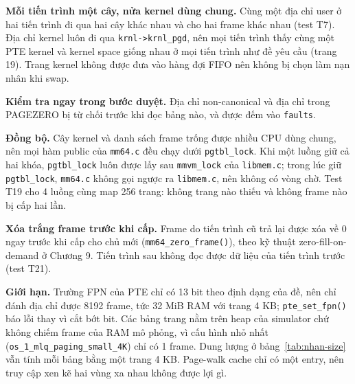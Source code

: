 \documentclass[12pt,a4paper]{article}
\begin{document}
	\medskip
	\noindent\textbf{Mỗi tiến trình một cây, nửa kernel dùng chung.} Cùng một địa chỉ user ở hai tiến trình đi qua hai cây khác nhau và cho hai frame khác nhau (test T7). Địa chỉ kernel luôn đi qua \texttt{krnl->krnl\_pgd}, nên mọi tiến trình thấy cùng một PTE kernel và kernel space giống nhau ở mọi tiến trình như đề yêu cầu (trang 19). Trang kernel không được đưa vào hàng đợi FIFO nên không bị chọn làm nạn nhân khi swap.

	\medskip
	\noindent\textbf{Kiểm tra ngay trong bước duyệt.} Địa chỉ non-canonical và địa chỉ trong PAGEZERO bị từ chối trước khi đọc bảng nào, và được đếm vào \texttt{faults}.

	\medskip
	\noindent\textbf{Đồng bộ.} Cây kernel và danh sách frame trống được nhiều CPU dùng chung, nên mọi hàm public của \texttt{mm64.c} đều chạy dưới \texttt{pgtbl\_lock}. Khi một luồng giữ cả hai khóa, \texttt{pgtbl\_lock} luôn được lấy sau \texttt{mmvm\_lock} của \texttt{libmem.c}; trong lúc giữ \texttt{pgtbl\_lock}, \texttt{mm64.c} không gọi ngược ra \texttt{libmem.c}, nên không có vòng chờ. Test T19 cho 4 luồng cùng map 256 trang: không trang nào thiếu và không frame nào bị cấp hai lần.

	\medskip
	\noindent\textbf{Xóa trắng frame trước khi cấp.} Frame do tiến trình cũ trả lại được xóa về 0 ngay trước khi cấp cho chủ mới (\texttt{mm64\_zero\_frame()}), theo kỹ thuật zero-fill-on-demand ở Chương 9. Tiến trình sau không đọc được dữ liệu của tiến trình trước (test T21).

	\medskip
	\noindent\textbf{Giới hạn.} Trường FPN của PTE chỉ có 13 bit theo định dạng của đề, nên chỉ đánh địa chỉ được 8192 frame, tức 32 MiB RAM với trang 4 KB; \texttt{pte\_set\_fpn()} báo lỗi thay vì cắt bớt bit. Các bảng trang nằm trên heap của simulator chứ không chiếm frame của RAM mô phỏng, vì cấu hình nhỏ nhất (\texttt{os\_1\_mlq\_paging\_small\_4K}) chỉ có 1 frame. Dung lượng ở bảng~\ref{tab:nhan-size} vẫn tính mỗi bảng bằng một trang 4 KB. Page-walk cache chỉ có một entry, nên truy cập xen kẽ hai vùng xa nhau không được lợi gì.
\end{document}
